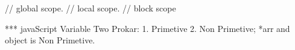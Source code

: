 // global scope.
// local scope.
// block scope

*** javaScript Variable Two Prokar: 1. Primetive 2. Non Primetive;
*arr and object is Non Primetive.